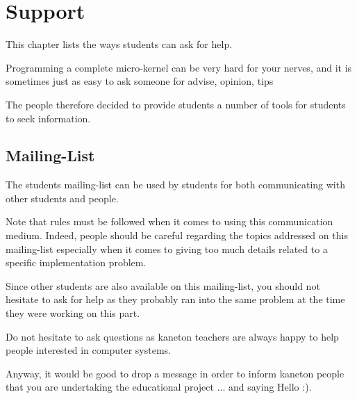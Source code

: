 %
%
%
%
%
%

%
%

\chapter{Support}
\label{chapter:support}

This chapter lists the ways students can ask for help.

\newpage

%
%

Programming a complete micro-kernel can be very hard for your nerves, and
it is sometimes just as easy to ask someone for advise, opinion, tips \etc{}

The  people therefore decided to provide students a number of
tools for students to seek information.

%
%

\section{Mailing-List}

The students mailing-list can be used by students for both communicating with
other students and  people.

Note that rules must be followed when it comes to using this communication
medium. Indeed, people should be careful regarding the topics addressed
on this mailing-list especially when it comes to giving too much details
related to a specific implementation problem.

Since other students are also available on this mailing-list, you should not
hesitate to ask for help as they probably ran into the same problem at the
time they were working on this part.

Do not hesitate to ask questions as kaneton teachers are always happy
to help people interested in computer systems.

Anyway, it would be good to drop a message in order to inform kaneton
people that you are undertaking the educational project ... and saying
Hello :).

